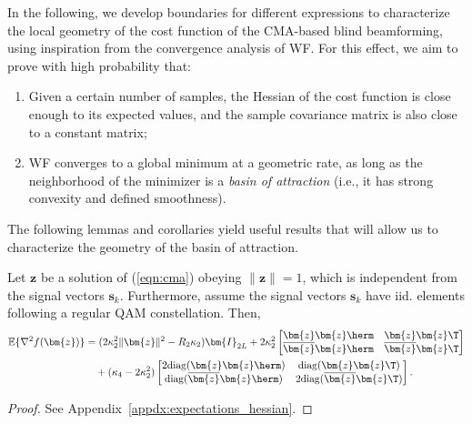 In the following, we develop boundaries for different expressions to characterize the local geometry of the cost function of the CMA-based blind beamforming, using inspiration from the convergence analysis of WF. For this effect, we aim to prove with high probability that:
\begin{enumerate}
	\item Given a certain number of samples, the Hessian of the cost function is close enough to its expected values, and the sample covariance matrix is also close to a constant matrix;
	\item WF converges to a global minimum at a geometric rate, as long as the neighborhood of the minimizer is a \textit{basin of attraction} (i.e., it has strong convexity and defined smoothness).%
\end{enumerate}

The following lemmas and corollaries yield useful results that will allow us to characterize the geometry of the basin of attraction.

\begin{lem} \label{lemma:expectation_hessian}
	Let $\bm{z}$ be a solution of (\ref{eqn:cma}) obeying $\|\bm{z}\|= 1$, which is independent from the signal vectors $\bm{s}_k$. Furthermore, assume the signal vectors $\bm{s}_k$ have iid. elements following a regular QAM constellation. Then,
	\begin{align}
	\mathbb{E}\{\nabla^2 f(\bm{z})\}&=  (2\kappa_2^2\|\bm{z}\|^2-R_2\kappa_2)\bm{I}_{2L}+ 2\kappa_2^2\begin{bmatrix}
	\bm{z}\bm{z}\herm&\bm{z}\bm{z}\T\\
	\overline{\bm{z}}\bm{z}\herm&\overline{\bm{z}}\bm{z}\T
	\end{bmatrix}\nonumber\\
	&\quad+(\kappa_4-2\kappa_2^2)\begin{bmatrix}
	2\mathrm{diag}(\bm{z}\bm{z}\herm)&\mathrm{diag}(\bm{z}\bm{z}\T)\\
	\mathrm{diag}(\overline{\bm{z}}\bm{z}\herm)&2\mathrm{diag}(\overline{\bm{z}}\bm{z}\T)
	\end{bmatrix}. \label{eqn:hessian_expectation}
	\end{align}
\end{lem} 
\begin{proof}
	See Appendix~\ref{appdx:expectations_hessian}.
\end{proof}

